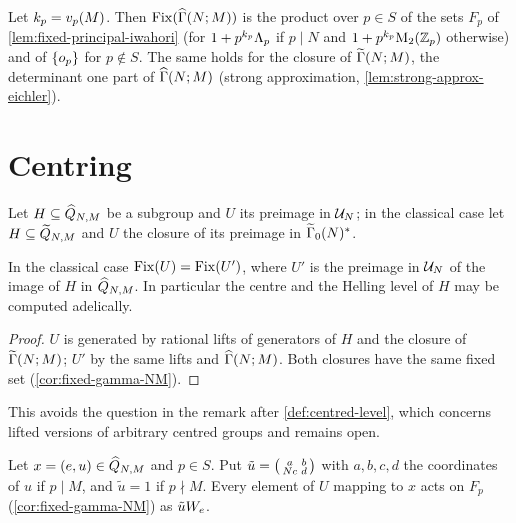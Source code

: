 \begin{corollary}\label{cor:fixed-gamma-NM}
Let $k_p = v_{p}(M)$. Then $\FixedSet{\GammaPrincipal[ad]{N}{M}}$ is the
product over $p \in S$ of the sets $F_p$ of
\cref{lem:fixed-principal-iwahori} (for $1 + p^{k_p}\Lambda_{p}$ if
$p \mid N$ and $1 + p^{k_p}\mathrm{M}_{2}(\mathbb{Z}_{p})$ otherwise) and of
$\{o_{p}\}$ for $p \notin S$. The same holds for the closure
of $\GammaPrincipal[lift]{N}{M}$, the determinant one part of
$\GammaPrincipal[ad]{N}{M}$ (strong approximation,
\cref{lem:strong-approx-eichler}).
\end{corollary}

\section{Centring}

Let $H \subseteq \widehat{Q}_{N,M}$ be a subgroup and $U$ its
preimage in $\mathcal{U}_{N}$; in the classical case let
$H \subseteq \widetilde{Q}_{N,M}$ and $U$ the closure of its preimage
in $\GammaZeroStar[lift]{N}$.

\begin{lemma}\label{lem:classical-fix}
In the classical case $\mathrm{Fix}(U) = \mathrm{Fix}(U')$, where $U'$ is the
preimage in $\mathcal{U}_{N}$ of the image of $H$ in
$\widehat{Q}_{N,M}$. In particular the centre and the Helling level of
$H$ may be computed adelically.
\end{lemma}

\begin{proof}
$U$ is generated by rational lifts of generators of $H$ and the closure of
$\GammaPrincipal[lift]{N}{M}$; $U'$ by the same lifts and
$\GammaPrincipal[ad]{N}{M}$. Both closures have the same fixed set
(\cref{cor:fixed-gamma-NM}).
\end{proof}

This avoids the question in the remark after \cref{def:centred-level}, which
concerns lifted versions of arbitrary centred groups and remains open.

\begin{lemma}\label{lem:local-action}
Let $x = (e, u) \in \widehat{Q}_{N,M}$ and $p \in S$. Put
$\tilde u = \left(\begin{smallmatrix} a & b \\ Nc & d \end{smallmatrix}\right)$ with $a, b, c, d$ the coordinates of $u$
if $p \mid M$, and $\tilde u = 1$ if $p \nmid M$. Every element of $U$ mapping
to $x$ acts on $F_p$ (\cref{cor:fixed-gamma-NM}) as $\tilde uW_{e}$.
\end{lemma}


